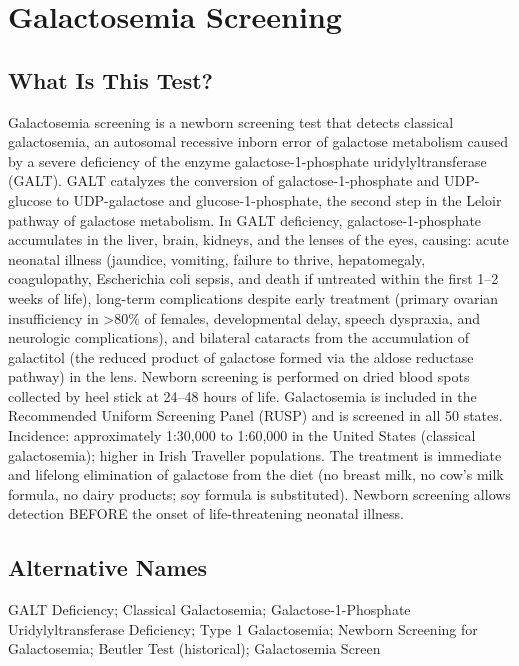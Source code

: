\chapter{Galactosemia Screening}

\section*{What Is This Test?}
Galactosemia screening is a newborn screening test that detects classical galactosemia, an autosomal recessive inborn error of galactose metabolism caused by a severe deficiency of the enzyme galactose-1-phosphate uridylyltransferase (GALT). GALT catalyzes the conversion of galactose-1-phosphate and UDP-glucose to UDP-galactose and glucose-1-phosphate, the second step in the Leloir pathway of galactose metabolism. In GALT deficiency, galactose-1-phosphate accumulates in the liver, brain, kidneys, and the lenses of the eyes, causing: acute neonatal illness (jaundice, vomiting, failure to thrive, hepatomegaly, coagulopathy, Escherichia coli sepsis, and death if untreated within the first 1--2 weeks of life), long-term complications despite early treatment (primary ovarian insufficiency in >80\% of females, developmental delay, speech dyspraxia, and neurologic complications), and bilateral cataracts from the accumulation of galactitol (the reduced product of galactose formed via the aldose reductase pathway) in the lens. Newborn screening is performed on dried blood spots collected by heel stick at 24--48 hours of life. Galactosemia is included in the Recommended Uniform Screening Panel (RUSP) and is screened in all 50 states. Incidence: approximately 1:30,000 to 1:60,000 in the United States (classical galactosemia); higher in Irish Traveller populations. The treatment is immediate and lifelong elimination of galactose from the diet (no breast milk, no cow's milk formula, no dairy products; soy formula is substituted). Newborn screening allows detection BEFORE the onset of life-threatening neonatal illness.

\section*{Alternative Names}
GALT Deficiency; Classical Galactosemia; Galactose-1-Phosphate Uridylyltransferase Deficiency; Type 1 Galactosemia; Newborn Screening for Galactosemia; Beutler Test (historical); Galactosemia Screen

